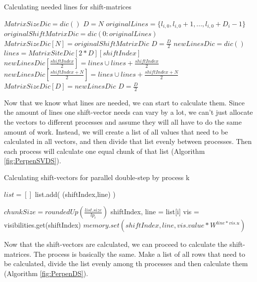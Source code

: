 \documentclass[12pt]{article}
\begin{document}
\begin{algorithm}
\caption{Calculating needed lines for shift-matrices}\label{euclid}
\label{fig:RecusriveLines}
\begin{algorithmic}[1]
\State $MatrixSizeDic = dic()$
\State $D = N$
\State $originalLines = \{l_{i,0},l_{i,0}+1,...,l_{i,0}+D_i-1\}$
\State $originalShiftMatrixDic = dic( 0: originalLines )$
\State $MatrixSizeDic[N] = originalShiftMatrixDic$
\State $D = \frac{D}{2}$
        \State $newLinesDic = dic()$
             \State $lines = MatrixSiteDic[2*D][shiftIndex]$
             \State $newLinesDic[\frac{shiftIndex}{2}] = lines \cup lines+\frac{shiftIndex}{2}$
             \State $newLinesDic[\frac{shiftIndex+N}{2}]= lines \cup lines+\frac{shiftIndex+N}{2}$
        \EndFor
        \State $MatrixSizeDic[D] = newLinesDic$
        \State $D = \frac{D}{2}$
\EndWhile
\end{algorithmic}
\end{algorithm}

Now that we know what lines are needed, we can start to calculate them. Since the amount of lines one shift-vector needs can vary by a lot, we can't just allocate the vectors to different processes and assume they will all have to do the same amount  of work. Instead, we will create a list of all values that need to be calculated in all vectors, and then divide that list evenly between processes. Then each process will calculate one equal chunk of that list (Algorithm \ref{fig:PerpenSVDS}).\\

\begin{algorithm}
\caption{Calculating shift-vectors for parallel double-step by process k}\label{euclid}
\label{fig:PerpenSVDS}
\begin{algorithmic}[1]
\State $list = []$
          list.add( (shiftIndex,line) )
     \EndFor
\EndFor

\State $chunkSize = roundedUp( \frac{list.size}{lp_i} )$
     \State shiftIndex, line = list[i]
     \State vis = visibilities.get(shiftIndex)
     \State $memory.set( shiftIndex, line, vis.value*W^{line*vis.u} )$
\EndFor
\end{algorithmic}
\end{algorithm}

Now that the shift-vectors are calculated, we can proceed to calculate the shift-matrices. The process is basically the same. Make a list of all rows that need to be calculated, divide the list evenly among th processes and then calculate them (Algorithm \ref{fig:PerpenDS}).
\end{document}
